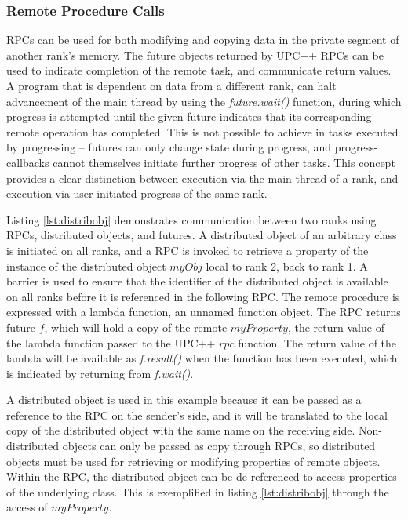 \documentclass{uit-report}
\begin{document}
\subsubsection{Remote Procedure Calls}

RPCs can be used for both modifying and copying data in the private segment of another rank's memory. The future objects returned by UPC++ RPCs can be used to indicate completion of the remote task, and communicate return values. A program that is dependent on data from a different rank, can halt advancement of the main thread by using the \emph{future.wait()} function, during which progress is attempted until the given future indicates that its corresponding remote operation has completed. This is not possible to achieve in tasks executed by progressing -- futures can only change state during progress, and progress-callbacks cannot themselves initiate further progress of other tasks. This concept provides a clear distinction between execution via the main thread of a rank, and execution via user-initiated progress of the same rank.

Listing \ref{lst:distribobj} demonstrates communication between two ranks using RPCs, distributed objects, and futures. A distributed object of an arbitrary class is initiated on all ranks, and a RPC is invoked to retrieve a property of the instance of the distributed object $myObj$ local to rank 2, back to rank 1. A barrier is used to ensure that the identifier of the distributed object is available on all ranks before it is referenced in the following RPC. The remote procedure is expressed with a lambda function, an unnamed function object. The RPC returns future $f$, which will hold a copy of the remote $myProperty$, the return value of the lambda function passed to the UPC++ $rpc$ function. The return value of the lambda will be available as \emph{f.result()} when the function has been executed, which is indicated by returning from \emph{f.wait()}. 

A distributed object is used in this example because it can be passed as a reference to the RPC on the sender's side, and it will be translated to the local copy of the distributed object with the same name on the receiving side. Non-distributed objects can only be passed as copy through RPCs, so distributed objects must be used for retrieving or modifying properties of remote objects. Within the RPC, the distributed object can be de-referenced to access properties of the underlying class. This is exemplified in listing \ref{lst:distribobj} through the access of $myProperty$.
\end{document}
